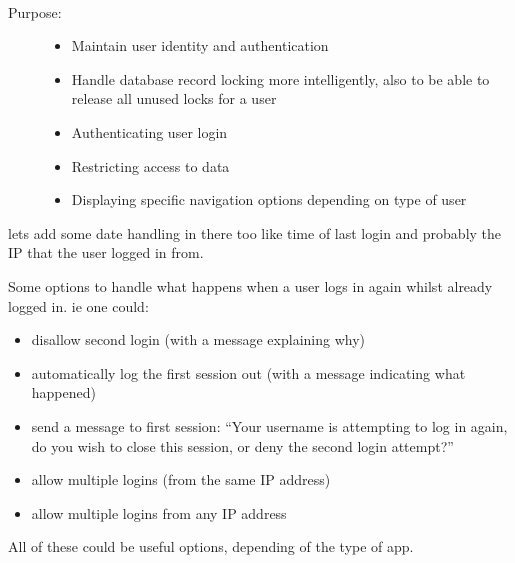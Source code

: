 \documentclass[letterpaper,10pt,english]{sphinxmanual}
\begin{document}
\begin{fulllineitems}
\label{knop_user:knop_user}~\begin{description}
\item[{Purpose:}] \leavevmode\begin{itemize}
\item {} 
Maintain user identity and authentication

\item {} 
Handle database record locking more intelligently, also to be able to release all unused locks for a user

\item {} 
Authenticating user login

\item {} 
Restricting access to data

\item {} 
Displaying specific navigation options depending on type of user

\end{itemize}

\end{description}

lets add some date handling in there too like time of last login
and probably the IP that the user logged in from.

Some options to handle what happens when a user logs in again whilst already logged in.
ie one could:
\begin{itemize}
\item {} 
disallow second login (with a message explaining why)

\item {} 
automatically log the first session out (with a message indicating what happened)

\item {} 
send a message to first session: ``Your username is attempting to log in again, do you wish to close this session, or deny the second login attempt?''

\item {} 
allow multiple logins (from the same IP address)

\item {} 
allow multiple logins from any IP address

\end{itemize}

All of these could be useful options, depending of the type of app.


\end{fulllineitems}
\end{document}
